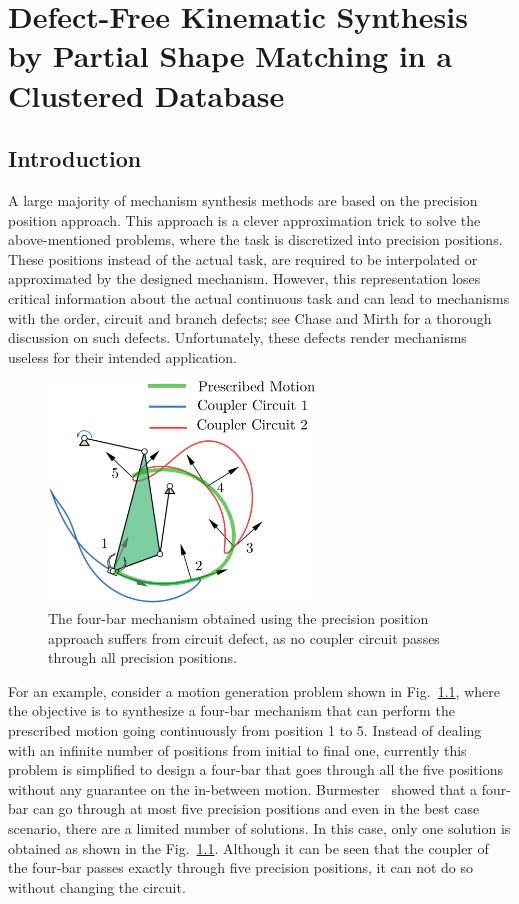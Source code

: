 \chapter{Defect-Free Kinematic Synthesis by Partial Shape Matching in a Clustered Database}\label{ch-ml-2018}

\section{Introduction}
A large majority of mechanism synthesis methods are based on the precision position approach.
This approach is a clever approximation trick to solve the above-mentioned problems, where the task is discretized into precision positions. These positions instead of the actual task, are required to be interpolated or approximated by the designed mechanism. However, this representation loses critical information about the actual continuous task and can lead to mechanisms with the order, circuit and branch defects; see Chase and Mirth\cite{chasemirth} for a thorough discussion on such defects. Unfortunately, these defects render mechanisms useless for their intended application.
\begin{figure}
\centering
\includegraphics[width=200pt]{jcise-18/figure/fig_circuit_defect.eps}
  \caption{The four-bar mechanism obtained using the precision position approach suffers from circuit defect, as no coupler circuit passes through all precision positions.}
\label{circuit_defect}
\end{figure}
For an example, consider a motion generation problem shown in Fig.~\ref{circuit_defect}, where the objective is to synthesize a four-bar mechanism that can perform the prescribed motion going continuously from position 1 to 5. Instead of dealing with an infinite number of positions from initial to final one, currently this problem is simplified to design a four-bar that goes through all the five positions without any guarantee on the in-between motion. Burmester~\cite{Burmester86} showed that a four-bar can go through at most five precision positions and even in the best case scenario, there are a limited number of solutions. In this case, only one solution is obtained as shown in the Fig.~\ref{circuit_defect}. Although it can be seen that the coupler of the four-bar passes exactly through five precision positions, it can not do so without changing the circuit.
